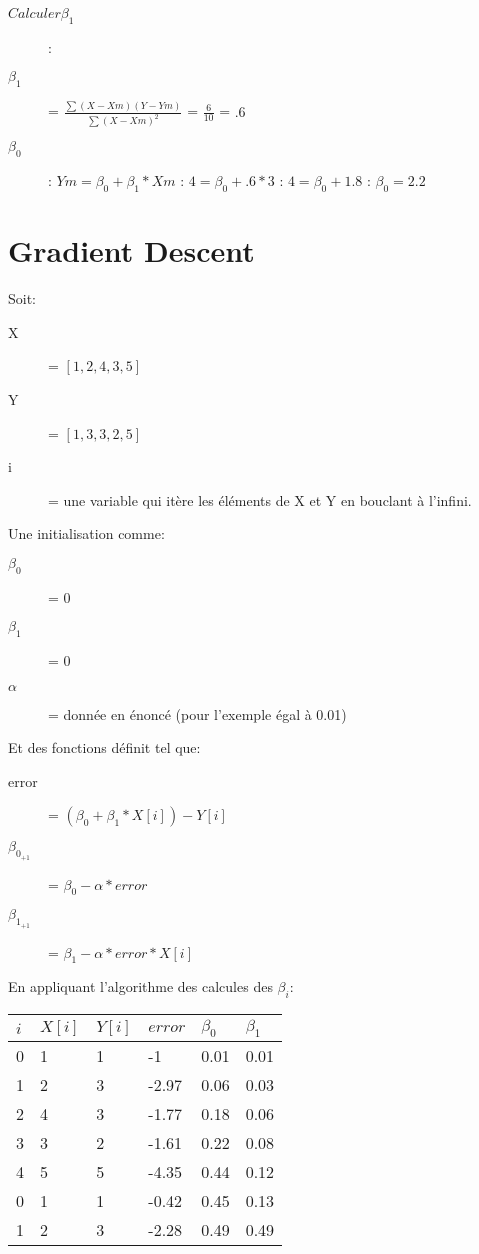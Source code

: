 \begin{description}
\item[$Calculer \beta_1$]:
\item[$ \beta_1 $] = $ \frac{ \sum (X-Xm)(Y-Ym)}{ \sum (X-Xm)^2}$ = $\frac{6}{10}$ = $.6$
\item[$ \beta_0 $]: $Ym = \beta_0 + \beta_1 * Xm$ : $4 = \beta_0 + .6 * 3$ : $4= \beta_0 + 1.8$ : $\beta_0 = 2.2$
\end{description}
\pagebreak
\section{Gradient Descent}
Soit:
\begin{description}
\item[X] = $[1,2,4,3,5]$
\item[Y] = $[1,3,3,2,5]$
\item[i] = une variable qui itère les éléments de X et Y en bouclant à l'infini.
\end{description}
Une initialisation comme:
\begin{description}
\item[$\beta_0$] = 0
\item[$\beta_1$] = 0
\item[$\alpha$] = donnée en énoncé (pour l'exemple égal à 0.01)
\end{description}
Et des fonctions définit tel que:
\begin{description}
\item[error] = $(\beta_0 + \beta_1 * X[i]) - Y[i]$
\item[$\beta_{0_{+1}}$] = $\beta_0 - \alpha * error$
\item[$\beta_{1_{+1}}$] = $\beta_1 - \alpha * error * X[i]$
\end{description}

En appliquant l'algorithme des calcules des $\beta_i$:\\
\begin{tabular}{l|l|l|l|l|l}
  \hline
  $ i $ & $ X[i] $ &  $Y[i] $ &  $error $ & $ \beta_0 $ & $ \beta_1 $\\
  \hline
  0 & 1 & 1 & -1 & 0.01 & 0.01 \\
  1 & 2 & 3 & -2.97 & 0.06 & 0.03\\
  2 & 4 & 3 & -1.77 & 0.18 & 0.06\\
  3 & 3 & 2 & -1.61 & 0.22 & 0.08\\
  4 & 5 & 5 & -4.35 & 0.44 & 0.12\\
  0 & 1 & 1 & -0.42 & 0.45 & 0.13\\
  1 & 2 & 3 & -2.28 & 0.49 & 0.49\\
  \hline
\end{tabular}
\pagebreak
